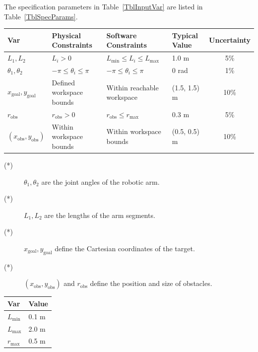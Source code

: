 \documentclass[12pt]{article}
\begin{document}
The specification parameters in Table~\ref{TblInputVar} are listed in Table~\ref{TblSpecParams}.

\begin{table}[!h]
  \caption{Input Variables for 2D-RAPP} \label{TblInputVar}
  \renewcommand{\arraystretch}{1.2}
\noindent \begin{longtable*}{l l l l c} 
  \toprule
  \textbf{Var} & \textbf{Physical Constraints} & \textbf{Software Constraints} &
                             \textbf{Typical Value} & \textbf{Uncertainty}\\
  \midrule 
  $L_1, L_2$ & $L_i > 0$ & $L_{\text{min}} \leq L_i \leq L_{\text{max}}$ & 1.0 \si[per-mode=symbol] {\metre} & 5\%
  \\
  $\theta_1, \theta_2$ & $-\pi \leq \theta_i \leq \pi$ & $-\pi \leq \theta_i \leq \pi$ & 0 \si[per-mode=symbol]{\radian} & 1\%
  \\
  $x_{\text{goal}}, y_{\text{goal}}$ & Defined workspace bounds & Within reachable workspace & (1.5, 1.5) \si[per-mode=symbol]{\metre} & 10\%
  \\
  $r_{\text{obs}}$ & $r_{\text{obs}} > 0$ & $r_{\text{obs}} \leq r_{\text{max}}$ & 0.3 \si[per-mode=symbol]{\metre} & 5\%
  \\
  $(x_{\text{obs}}, y_{\text{obs}})$ & Within workspace bounds & Within workspace bounds & (0.5, 0.5) \si[per-mode=symbol]{\metre} & 10\%
  \\
  \bottomrule
\end{longtable*}
\end{table}

\noindent 
\begin{description}
\item[(*)] $\theta_1, \theta_2$ are the joint angles of the robotic arm.
\item[(*)] $L_1, L_2$ are the lengths of the arm segments.
\item[(*)] $x_{\text{goal}}, y_{\text{goal}}$ define the Cartesian coordinates of the target.
\item[(*)] $(x_{\text{obs}}, y_{\text{obs}})$ and $r_{\text{obs}}$ define the position and size of obstacles.
\end{description}

\begin{table}[!h]
\caption{Specification Parameter Values for 2D-RAPP} \label{TblSpecParams}
\renewcommand{\arraystretch}{1.2}
\noindent \begin{longtable*}{l l} 
  \toprule
  \textbf{Var} & \textbf{Value} \\
  \midrule 
  $L_\text{min}$ & 0.1 \si{\metre}\\
  $L_\text{max}$ & 2.0 \si{\metre}\\
  $r_{\text{max}}$ & 0.5 \si{\metre}\\
  \bottomrule
\end{longtable*}
\end{table}
\end{document}
